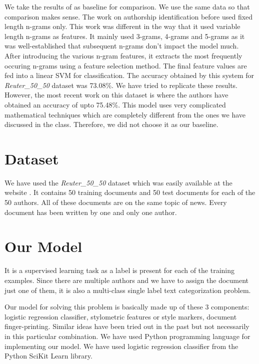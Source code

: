 \documentclass[letterpaper]{article}
\begin{document}
We take the results of \cite{baseline} as baseline for comparison. We use the same data so that comparison makes sense. The work on authorship identification before \cite{baseline} used fixed length n-grams only. This work was different in the way that it used variable length n-grams as features. It mainly used 3-grams, 4-grams and 5-grams as it was well-established that subsequent n-grams don't impact the model much. After introducing the various n-gram features, it extracts the most frequently occuring n-grams using a feature selection method. The final feature values are fed into a linear SVM for classification. The accuracy obtained by this system for \textit{Reuter\_50\_50} dataset was 73.08\%. We have tried to replicate these results. However, the most recent work on this dataset is \cite{latest} where the authors have obtained an accuracy of upto 75.48\%. This model uses very complicated mathematical techniques which are completely different from the ones we have discussed in the class. Therefore, we did not choose it as our baseline.


\section{Dataset}
We have used the \textit{Reuter\_50\_50} dataset which was easily available at the website \cite{reuter}. It contains 50 training documents and 50 test documents for each of the 50 authors. All of these documents are on the same topic of news. Every document has been written by one and only one author.

\section{Our Model}
It is a supervised learning task as a label is present for each of the training examples. Since there are multiple authors and we have to assign the document just one of them, it is also a multi-class single label text categorization problem.

Our model for solving this problem is basically made up of these 3 components: logistic regression classifier, stylometric features or style markers, document finger-printing. Similar ideas have been tried out in the past but not necessarily in this particular combination. We have used Python programming language for implementing our model. We have used logistic regression classifier from the Python SciKit Learn library.
\end{document}
